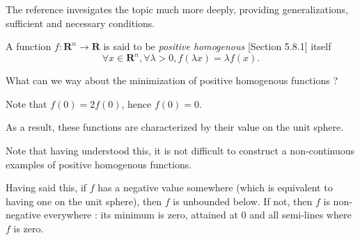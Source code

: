\begin{remark}
    The reference \cite{nguyen2019} invesigates the topic much more deeply, providing generalizations, sufficient and necessary conditions.
\end{remark}

\begin{exercise}
    A function $ f : \mathbf R^n \to \mathbf R $ is said to be \textit{positive homogenous} \cite{boydvandenberghe2004}[Section 5.8.1] itself
    \[
        \forall x \in \mathbf R^n, \forall \lambda > 0, f(\lambda x) = \lambda f(x).
    \]

    What can we way about the minimization of positive homogenous functions ?
\end{exercise}

\begin{solution}
    Note that $ f(0) = 2 f(0) $, hence $ f(0) = 0 $.
    
    As a result, these functions are characterized by their value on the unit sphere.

    Note that having understood this, it is not difficult to construct a non-continuous examples of positive homogenous functions.

    Having said this, if $ f $ has a negative value somewhere (which is equivalent to having one on the unit sphere), then $ f $ is unbounded below. If not, then $ f $ is non-negative everywhere : its minimum is zero, attained at $ 0 $ and all semi-lines where $ f $ is zero.
\end{solution}